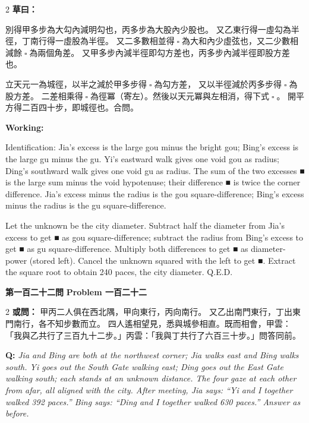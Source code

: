 \documentclass[11pt,a4paper]{article}
\let\origsquare\square
\renewcommand{\square}{\ensuremath{\origsquare}}%
\newcommand{\wen}[1]{%
  \par\vspace{0.5em}%
  \noindent\textcolor{problemcolor}{\textbf{第#1問}}%
  \hfill\textcolor{problemcolor}{\textbf{Problem #1}}\par\nopagebreak%
  \vspace{0.3em}%
}
\newcommand{\owen}[1]{%
  \noindent\textcolor{problemcolor}{\textbf{或問：}}{\tradfont #1}\par\nopagebreak%
}
\newcommand{\oweneng}[1]{%
  \noindent\textcolor{engcolor}{\textbf{Q: }}{\itshape #1}\par\nopagebreak%
}
\newcommand{\tsaoyue}[1]{%
  \noindent\textcolor{workcolor}{\textbf{草曰：}}{\tradfont #1}\par%
}
\newcommand{\tsaoyueeng}[1]{%
  \noindent\textcolor{engcolor}{\textbf{Working: }}{\small #1}\par%
}
\begin{document}
\begin{paracol}{2}
\tsaoyue{%
別得甲多步為大勾內減明勾也，丙多步為大股內少股也。
又乙東行得一虛勾為半徑，丁南行得一虛股為半徑。
又二多數相並得$ \; \square \; $為大和內少虛弦也，又二少數相減餘$ \; \square \; $為兩個角差。
又甲多步內減半徑即勾方差也，丙多步內減半徑即股方差也。

立天元一為城徑，以半之減於甲多步得$ \; \square \; $為勾方差，
又以半徑減於丙多步得$ \; \square \; $為股方差。
二差相乘得$ \; \square \; $為徑冪（寄左）。然後以天元冪與左相消，得下式$ \; \square \; $。
開平方得二百四十步，即城徑也。合問。}
\switchcolumn
\tsaoyueeng{%
Identification: Jia's excess is the large gou minus the bright gou; Bing's excess is the large gu minus the gu. Yi's eastward walk gives one void gou as radius; Ding's southward walk gives one void gu as radius. The sum of the two excesses ■ is the large sum minus the void hypotenuse; their difference ■ is twice the corner difference. Jia's excess minus the radius is the gou square-difference; Bing's excess minus the radius is the gu square-difference.

Let the unknown be the city diameter. Subtract half the diameter from Jia's excess to get ■ as gou square-difference; subtract the radius from Bing's excess to get ■ as gu square-difference. Multiply both differences to get ■ as diameter-power (stored left). Cancel the unknown squared with the left to get ■. Extract the square root to obtain 240 paces, the city diameter. Q.E.D.}
\end{paracol}

\vspace{0.5cm}

\wen{一百二十二}

\begin{paracol}{2}
\owen{%
甲丙二人俱在西北隅，甲向東行，丙向南行。
又乙出南門東行，丁出東門南行，各不知步數而立。
四人遙相望見，悉與城參相直。既而相會，甲雲：
「我與乙共行了三百九十二步。」丙雲：「我與丁共行了六百三十步。」問答同前。}
\switchcolumn
\oweneng{%
Jia and Bing are both at the northwest corner; Jia walks east and Bing walks south. Yi goes out the South Gate walking east; Ding goes out the East Gate walking south; each stands at an unknown distance. The four gaze at each other from afar, all aligned with the city. After meeting, Jia says: ``Yi and I together walked 392 paces.'' Bing says: ``Ding and I together walked 630 paces.'' Answer as before.}
\end{paracol}
\end{document}
